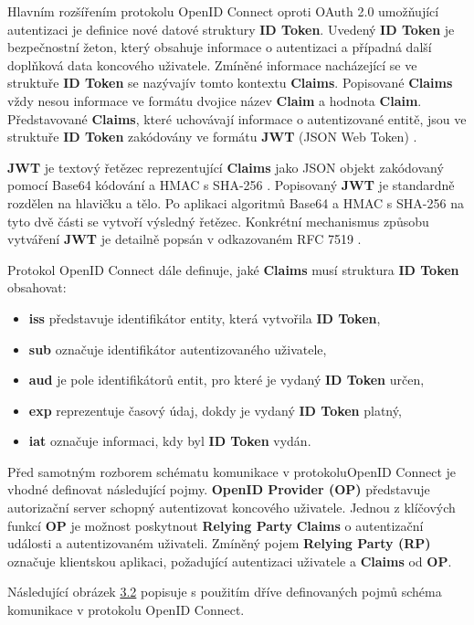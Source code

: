 \documentclass[
  printed, %
  twoside, %
  table,   %
  nolof,     %
  nolot,     %
]{fithesis3}
\begin{document}
Hlavním rozšířením protokolu OpenID Connect oproti OAuth 2.0 umožňující autentizaci je definice nové datové struktury \textbf{ID Token}. Uvedený \textbf{ID Token} je bezpečnostní žeton, který obsahuje informace o autentizaci a případná další doplňková data koncového uživatele. Zmíněné informace nacházející se ve struktuře \textbf{ID Token} se nazývají\break v tomto kontextu \textbf{Claims}. Popisované \textbf{Claims} vždy nesou informace ve formátu dvojice název \textbf{Claim} a hodnota \textbf{Claim}. Představované \textbf{Claims}, které uchovávají informace o autentizované entitě, jsou ve struktuře \textbf{ID Token} zakódovány ve formátu \textbf{JWT} (JSON Web Token) \cite{rfc7519}.    

\par

\textbf{JWT} je textový řetězec reprezentující \textbf{Claims} jako JSON objekt \cite{rfc8259}\break zakódovaný pomocí Base64 \cite{rfc4648} kódování a HMAC s SHA-256 \cite{rfc4868}. Popisovaný \textbf{JWT} je standardně rozdělen na hlavičku a tělo. Po aplikaci algoritmů Base64 a HMAC s SHA-256 na tyto dvě části se vytvoří výsledný řetězec. Konkrétní mechanismus způsobu vytváření \textbf{JWT} je detailně popsán v odkazovaném RFC 7519 \cite{rfc7519}. \par

Protokol OpenID Connect dále definuje, jaké \textbf{Claims} musí struktura \textbf{ID Token} obsahovat:

\begin{itemize}
    \item \textbf{iss} představuje identifikátor entity, která vytvořila \textbf{ID Token}, 
    \item \textbf{sub} označuje identifikátor autentizovaného uživatele, 
    \item \textbf{aud} je pole identifikátorů entit, pro které je vydaný \textbf{ID Token} určen,
    \item \textbf{exp} reprezentuje časový údaj, dokdy je vydaný \textbf{ID Token} platný,
    \item \textbf{iat} označuje informaci, kdy byl \textbf{ID Token} vydán.
\end{itemize}
\par

Před samotným rozborem schématu komunikace v protokolu\break OpenID Connect je vhodné definovat následující pojmy. \textbf{OpenID Provider (OP)} představuje autorizační server schopný autentizovat koncového uživatele. Jednou z klíčových funkcí \textbf{OP} je možnost poskytnout \textbf{Relying Party} \textbf{Claims} o autentizační události a autentizovaném uživateli. Zmíněný pojem \textbf{Relying Party (RP)} označuje klientskou aplikaci, požadující autentizaci uživatele a \textbf{Claims} od \textbf{OP}. \par
Následující obrázek \hyperref[fig:oidc]{3.2} popisuje s použitím dříve definovaných pojmů schéma komunikace v protokolu OpenID Connect.
\end{document}

